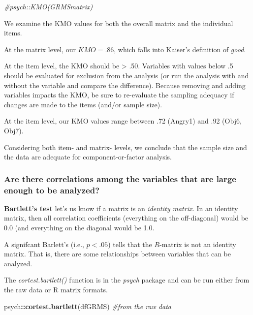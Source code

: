 \documentclass[
  english,
]{book}
\newenvironment{Shaded}{\begin{snugshade}}{\end{snugshade}}
\newcommand{\CommentTok}[1]{\textcolor[rgb]{0.56,0.35,0.01}{\textit{#1}}}
\newcommand{\KeywordTok}[1]{\textcolor[rgb]{0.13,0.29,0.53}{\textbf{#1}}}
\newcommand{\NormalTok}[1]{#1}
\newcommand{\OperatorTok}[1]{\textcolor[rgb]{0.81,0.36,0.00}{\textbf{#1}}}
\begin{document}
\begin{Shaded}
\begin{Highlighting}[]
\CommentTok{#psych::KMO(GRMSmatrix)}
\end{Highlighting}
\end{Shaded}

We examine the KMO values for both the overall matrix and the individual items.

At the matrix level, our \(KMO = .86\), which falls into Kaiser's definition of \emph{good}.

At the item level, the KMO should be \textgreater{} .50. Variables with values below .5 should be evaluated for exclusion from the analysis (or run the analysis with and without the variable and compare the difference). Because removing and adding variables impacts the KMO, be sure to re-evaluate the sampling adequacy if changes are made to the items (and/or sample size).

At the item level, our KMO values range between .72 (Angry1) and .92 (Obj6, Obj7).

Considering both item- and matrix- levels, we conclude that the sample size and the data are adequate for component-or-factor analysis.

\hypertarget{are-there-correlations-among-the-variables-that-are-large-enough-to-be-analyzed}{%
\subsubsection{Are there correlations among the variables that are large enough to be analyzed?}\label{are-there-correlations-among-the-variables-that-are-large-enough-to-be-analyzed}}

\textbf{Bartlett's test} let's us know if a matrix is an \emph{identity matrix.} In an identity matrix, then all correlation coefficients (everything on the off-diagonal) would be 0.0 (and everything on the diagonal would be 1.0.

A signifcant Barlett's (i.e., \(p < .05\)) tells that the \(R\)-matrix is not an identity matrix. That is, there are some relationships between variables that can be analyzed.

The \emph{cortest.bartlett()} function is in the \emph{psych} package and can be run either from the raw data or R matrix formats.

\begin{Shaded}
\begin{Highlighting}[]
\NormalTok{psych}\OperatorTok{::}\KeywordTok{cortest.bartlett}\NormalTok{(dfGRMS) }\CommentTok{#from the raw data}
\end{Highlighting}
\end{Shaded}
\end{document}
